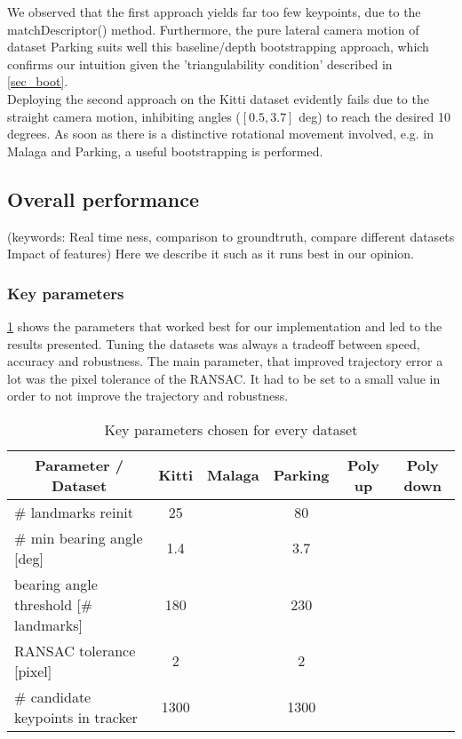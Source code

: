 We observed that the first approach yields far too few keypoints, due to the matchDescriptor() method. Furthermore, the pure lateral camera motion of dataset Parking suits well this baseline/depth bootstrapping approach, which confirms our intuition given the 'triangulability condition' described in \cref{sec_boot}.\\

Deploying the second approach on the Kitti dataset evidently fails due to the straight camera motion, inhibiting angles ($[0.5, 3.7]$ deg) to reach the desired 10 degrees. As soon as there is a distinctive rotational movement involved, e.g. in Malaga and Parking, a useful bootstrapping is performed.


\subsection{Overall performance}
(keywords: Real time ness, comparison to groundtruth, compare different datasets
Impact of features) Here we describe it such as it runs best in our opinion.

\subsubsection{Key parameters}
\cref{params_table} shows the parameters that worked best for our implementation and led to the results presented. Tuning the datasets was always a tradeoff between speed, accuracy and robustness. The main parameter, that improved trajectory error a lot was the pixel tolerance of the RANSAC. It had to be set to a small value in order to not improve the trajectory and robustness.
\begin{table}[!h]
	\centering
	\begin{tabular}{|l|c|c|c|c|c|}
	\hline
	\multicolumn{1}{|c|}{\textbf{Parameter / Dataset}} & \textbf{Kitti} & \textbf{Malaga} & \textbf{Parking} & \textbf{Poly up} & \textbf{Poly down} \\ \hline
	\# landmarks reinit                                & 25             &                 & 80               &                  &                    \\ \hline
	\# min bearing angle {[}deg{]}                     & 1.4            &                 & 3.7              &                  &                    \\ \hline
	bearing angle threshold {[}\# landmarks{]}         & 180            &                 & 230              &                  &                    \\ \hline
	RANSAC tolerance {[}pixel{]}                       & 2              &                 & 2                &                  &                    \\ \hline
	\# candidate keypoints in tracker                  & 1300           &                 & 1300             &                  &                    \\ \hline
	\end{tabular}
	\caption{Key parameters chosen for every dataset}
	\label{params_table}
\end{table}

